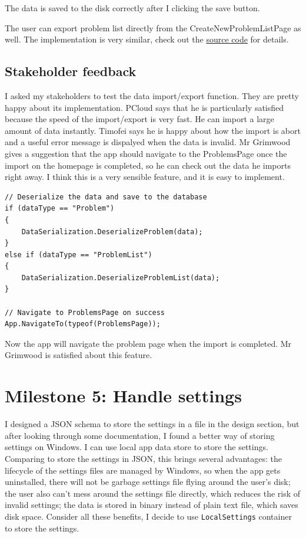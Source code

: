 \documentclass[a4paper]{report}
\newcommand{\code}{\texttt}
\begin{document}
The data is saved to the disk correctly after I clicking the save button.

The user can export problem list directly from the CreateNewProblemListPage as well. The implementation is very similar, check out the \hyperref[subsubsec:createnewproblemlistpage]{source code} for details.

\subsection{Stakeholder feedback}

I asked my stakeholders to test the data import/export function. They are pretty happy about its implementation. PCloud says that he is particularly satisfied because the speed of the import/export is very fast. He can import a large amount of data instantly. Timofei says he is happy about how the import is abort and a useful error message is dispalyed when the data is invalid. Mr Grimwood gives a suggestion that the app should navigate to the ProblemsPage once the import on the homepage is completed, so he can check out the data he imports right away. I think this is a very sensible feature, and it is easy to implement.

\begin{verbatim}
// Deserialize the data and save to the database
if (dataType == "Problem")
{
    DataSerialization.DeserializeProblem(data);
}
else if (dataType == "ProblemList")
{
    DataSerialization.DeserializeProblemList(data);
}

// Navigate to ProblemsPage on success
App.NavigateTo(typeof(ProblemsPage));
\end{verbatim}

Now the app will navigate the problem page when the import is completed. Mr Grimwood is satisfied about this feature.

\section{Milestone 5: Handle settings}

I designed a JSON schema to store the settings in a file in the design section, but after looking through some documentation, I found a better way of storing settings on Windows. I can use local app data store\cite{microsoft:docs:store-and-retrieve-app-data} to store the settings. Comparing to store the settings in JSON, this brings several advantages: the lifecycle of the settings files are managed by Windows, so when the app gets uninstalled, there will not be garbage settings file flying around the user's disk; the user also can't mess around the settings file directly, which reduces the risk of invalid settings; the data is stored in binary instead of plain text file, which saves disk space. Consider all these benefits, I decide to use \code{LocalSettings} container to store the settings.
\end{document}
